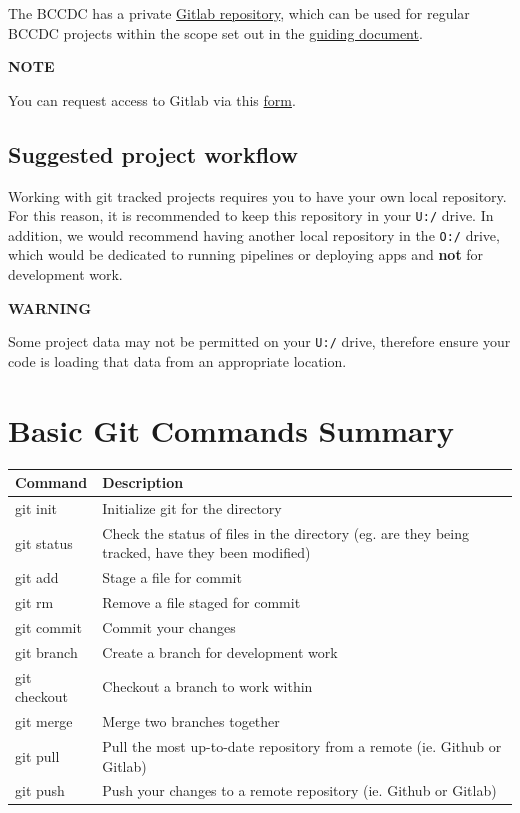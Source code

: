 \documentclass[
]{book}
\begin{document}
The BCCDC has a private \href{http://lvmgenodh01.phsabc.ehcnet.ca/}{Gitlab repository}, which can be used for regular BCCDC projects within the scope set out in the \href{https://healthbc-my.sharepoint.com/:w:/r/personal/kathleen_mclean_bccdc_ca/Documents/GitLab\%20Guideline\%20for\%20distribution.docx?d=w2584389db5be4a7d8dc59ed28080e351\&csf=1\&web=1\&e=OH30gE}{guiding document}.

\textbf{NOTE}

You can request access to Gitlab via this \href{https://surveys.vch.ca/Survey.aspx?s=62de2ddc1daf413091a8e063d80428cd}{form}.

\hypertarget{suggested-project-workflow}{%
\subsection{Suggested project workflow}\label{suggested-project-workflow}}

Working with git tracked projects requires you to have your own local repository. For this reason, it is recommended to keep this repository in your \texttt{U:/} drive. In addition, we would recommend having another local repository in the \texttt{O:/} drive, which would be dedicated to running pipelines or deploying apps and \textbf{not} for development work.

\textbf{WARNING}

Some project data may not be permitted on your \texttt{U:/} drive, therefore ensure your code is loading that data from an appropriate location.

\hypertarget{basic-git-commands-summary}{%
\section{Basic Git Commands Summary}\label{basic-git-commands-summary}}

\begin{tabular}{l|l}
\hline
Command & Description\\
\hline
git init & Initialize git for the directory\\
\hline
git status & Check the status of files in the directory (eg. are they being tracked, have they been modified)\\
\hline
git add & Stage a file for commit\\
\hline
git rm & Remove a file staged for commit\\
\hline
git commit & Commit your changes\\
\hline
git branch & Create a branch for development work\\
\hline
git checkout & Checkout a branch to work within\\
\hline
git merge & Merge two branches together\\
\hline
git pull & Pull the most up-to-date repository from a remote (ie. Github or Gitlab)\\
\hline
git push & Push your changes to a remote repository (ie. Github or Gitlab)\\
\hline
\end{tabular}
\end{document}
